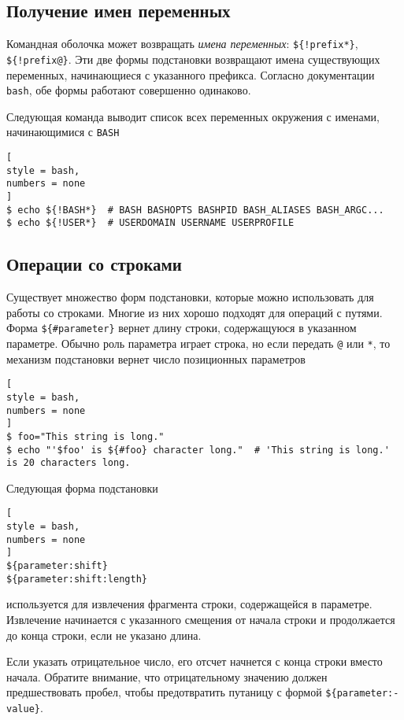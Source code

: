 \documentclass[%
	11pt,
	a4paper,
	utf8,
		]{article}
\begin{document}
\subsection{Получение имен переменных}

Командная оболочка может возвращать \emph{имена переменных}: \verb|${!prefix*}|, \verb|${!prefix@}|. Эти две формы подстановки возвращают имена существующих переменных, начинающиеся с указанного префикса. Согласно документации \texttt{bash}, обе формы работают совершенно одинаково. 

Следующая команда выводит список всех переменных окружения с именами, начинающимися с \texttt{BASH}
\begin{lstlisting}[
style = bash,
numbers = none
]
$ echo ${!BASH*}  # BASH BASHOPTS BASHPID BASH_ALIASES BASH_ARGC...
$ echo ${!USER*}  # USERDOMAIN USERNAME USERPROFILE
\end{lstlisting}

\subsection{Операции со строками}

Существует множество форм подстановки, которые можно использовать для работы со строками. Многие из них хорошо подходят для операций с путями. Форма \verb|${#parameter}| вернет длину строки, содержащуюся в указанном параметре. Обычно роль параметра играет строка, но если передать \verb|@| или \verb|*|, то механизм подстановки вернет число позиционных параметров
\begin{lstlisting}[
style = bash,
numbers = none
]
$ foo="This string is long."
$ echo "'$foo' is ${#foo} character long."  # 'This string is long.' is 20 characters long.
\end{lstlisting}

Следующая форма подстановки
\begin{lstlisting}[
style = bash,
numbers = none
]
${parameter:shift}
${parameter:shift:length}
\end{lstlisting}
используется для извлечения фрагмента строки, содержащейся в параметре. Извлечение начинается с указанного смещения от начала строки и продолжается до конца строки, если не указано длина.

Если указать отрицательное число, его отсчет начнется с конца строки вместо начала. Обратите внимание, что отрицательному значению должен предшествовать пробел, чтобы предотвратить путаницу с формой \verb|${parameter:-value}|. 
\end{document}
